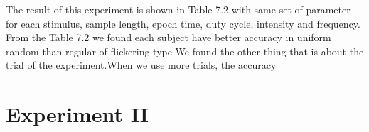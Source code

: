 \begin{table}[ht]
\centering
{}
\caption{Experiment result}
\label{table:3}
\end{table}

The result of this experiment is shown in Table 7.2 with same set of parameter for each stimulus, sample length, epoch time, duty cycle, intensity and frequency. From the Table 7.2 we found each subject have better accuracy in uniform random than regular of flickering type We found the other thing that is about the trial of the experiment.When we use more trials, the accuracy 
\newpage
\section{Experiment II}


























